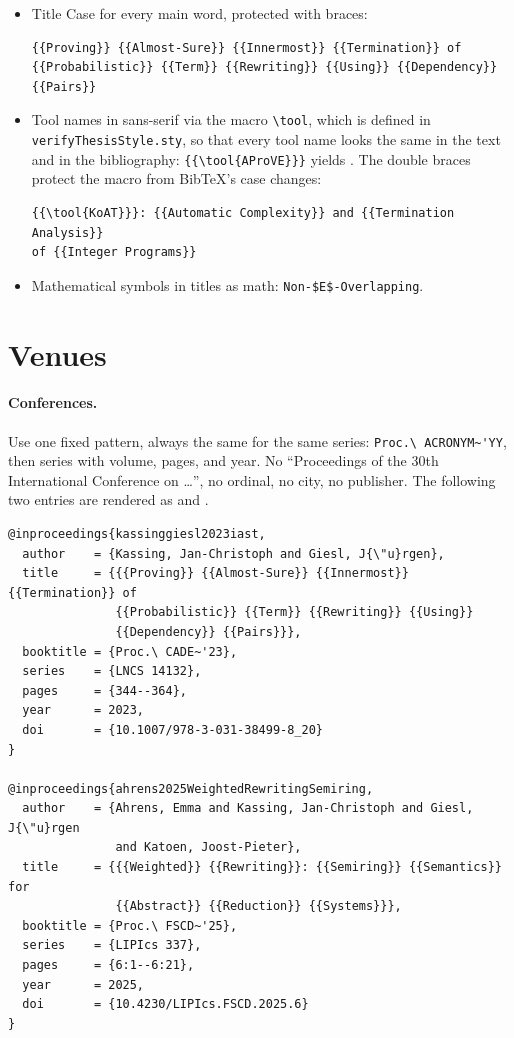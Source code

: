 \begin{itemize}
    \item Title Case for every main word, protected with braces:
\begin{lstlisting}
{{Proving}} {{Almost-Sure}} {{Innermost}} {{Termination}} of
{{Probabilistic}} {{Term}} {{Rewriting}} {{Using}} {{Dependency}} {{Pairs}}
\end{lstlisting}
    \item Tool names in sans-serif via the macro \lstinline|\tool|, which is
          defined in \lstinline|verifyThesisStyle.sty|, so that every tool name
          looks the same in the text and in the bibliography:
          \lstinline|{{\tool{AProVE}}}| yields \aprove{}.
          The double braces protect the macro from Bib\TeX's case changes:
\begin{lstlisting}
{{\tool{KoAT}}}: {{Automatic Complexity}} and {{Termination Analysis}}
of {{Integer Programs}}
\end{lstlisting}
    \item Mathematical symbols in titles as math: \lstinline|Non-$E$-Overlapping|.
\end{itemize}

\section{Venues}\label{sec:bib-venues}

\paragraph{Conferences.}
Use one fixed pattern, always the same for the same series:
\lstinline|Proc.\ ACRONYM~'YY|, then series with volume, pages, and year.
No ``Proceedings of the 30th International Conference on \ldots'', no ordinal,
no city, no publisher.
The following two entries are rendered as \cite{kassinggiesl2023iast} and
\cite{ahrens2025WeightedRewritingSemiring}.

\begin{lstlisting}
@inproceedings{kassinggiesl2023iast,
  author    = {Kassing, Jan-Christoph and Giesl, J{\"u}rgen},
  title     = {{{Proving}} {{Almost-Sure}} {{Innermost}} {{Termination}} of
               {{Probabilistic}} {{Term}} {{Rewriting}} {{Using}}
               {{Dependency}} {{Pairs}}},
  booktitle = {Proc.\ CADE~'23},
  series    = {LNCS 14132},
  pages     = {344--364},
  year      = 2023,
  doi       = {10.1007/978-3-031-38499-8_20}
}

@inproceedings{ahrens2025WeightedRewritingSemiring,
  author    = {Ahrens, Emma and Kassing, Jan-Christoph and Giesl, J{\"u}rgen
               and Katoen, Joost-Pieter},
  title     = {{{Weighted}} {{Rewriting}}: {{Semiring}} {{Semantics}} for
               {{Abstract}} {{Reduction}} {{Systems}}},
  booktitle = {Proc.\ FSCD~'25},
  series    = {LIPIcs 337},
  pages     = {6:1--6:21},
  year      = 2025,
  doi       = {10.4230/LIPIcs.FSCD.2025.6}
}
\end{lstlisting}

